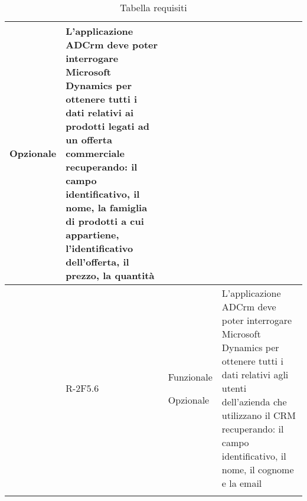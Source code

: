 \begin{longtable}{|r l|p{2.5cm}|p{10cm}|}
	Opzionale & L'applicazione ADCrm deve poter interrogare Microsoft Dynamics per ottenere tutti i dati relativi ai prodotti legati ad un offerta commerciale recuperando: il campo identificativo, il nome, la famiglia di prodotti a cui appartiene, l'identificativo dell'offerta, il prezzo, la quantità\tabularnewline
	\hline
	& R-2F5.6 & Funzionale
	
	Opzionale & L'applicazione ADCrm deve poter interrogare Microsoft Dynamics per ottenere tutti i dati relativi agli utenti dell'azienda che utilizzano il CRM recuperando: il campo identificativo, il nome, il cognome e la email\tabularnewline
	\hline
	\caption{Tabella requisiti} 
	\tabularnewline
\end{longtable}
